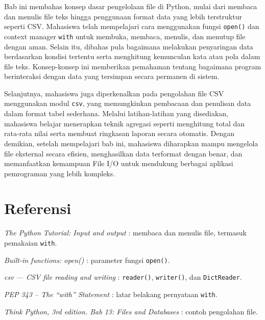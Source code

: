 Bab ini membahas konsep dasar pengelolaan file di Python, mulai dari membaca dan menulis file teks hingga penggunaan format data yang lebih terstruktur seperti CSV. Mahasiswa telah mempelajari cara menggunakan fungsi \texttt{open()} dan context manager \texttt{with} untuk membuka, membaca, menulis, dan menutup file dengan aman. Selain itu, dibahas pula bagaimana melakukan penyaringan data berdasarkan kondisi tertentu serta menghitung kemunculan kata atau pola dalam file teks. Konsep-konsep ini memberikan pemahaman tentang bagaimana program berinteraksi dengan data yang tersimpan secara permanen di sistem.

Selanjutnya, mahasiswa juga diperkenalkan pada pengolahan file CSV menggunakan modul \texttt{csv}, yang memungkinkan pembacaan dan penulisan data dalam format tabel sederhana. Melalui latihan-latihan yang disediakan, mahasiswa belajar menerapkan teknik agregasi seperti menghitung total dan rata-rata nilai serta membuat ringkasan laporan secara otomatis. Dengan demikian, setelah mempelajari bab ini, mahasiswa diharapkan mampu mengelola file eksternal secara efisien, menghasilkan data terformat dengan benar, dan memanfaatkan kemampuan File I/O untuk mendukung berbagai aplikasi pemrograman yang lebih kompleks.

\section*{Referensi}
\begin{daftarrapat}
  \item \textit{The Python Tutorial: Input and output} \cite{py-tut-io}: membaca dan menulis file, termasuk pemakaian \texttt{with}.
  \item \textit{Built-in functions: open()} \cite{py-functions-open}: parameter fungsi \texttt{open()}.
  \item \textit{csv — CSV file reading and writing} \cite{py-csv}: \texttt{reader()}, \texttt{writer()}, dan \texttt{DictReader}.
  \item \textit{PEP 343 – The “with” Statement} \cite{pep343}: latar belakang pernyataan \texttt{with}.
  \item \textit{Think Python, 3rd edition. Bab 13: Files and Databases} \cite{thinkpython-ch13}: contoh pengolahan file.
\end{daftarrapat}
